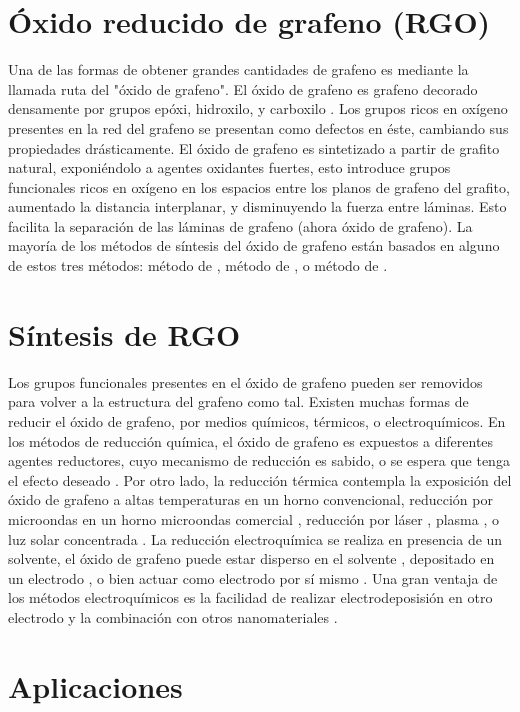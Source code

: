 \section{Óxido reducido de grafeno (RGO)}
Una de las formas de obtener grandes cantidades de grafeno es mediante la llamada ruta del "óxido de grafeno". El óxido de grafeno es grafeno decorado densamente por grupos epóxi, hidroxilo, y carboxilo \citep{Dreyer2010}. Los grupos ricos en oxígeno presentes en la red del grafeno se presentan como defectos en éste, cambiando sus propiedades drásticamente.
El óxido de grafeno es sintetizado a partir de grafito natural, exponiéndolo a agentes oxidantes fuertes, esto introduce grupos funcionales ricos en oxígeno en los espacios entre los planos de grafeno del grafito, aumentado la distancia interplanar, y disminuyendo la fuerza entre láminas. Esto facilita la separación de las láminas de grafeno (ahora óxido de grafeno). La mayoría de los métodos de síntesis del óxido de grafeno están basados en alguno de estos tres métodos: método de \citet{Brodie1859}, método de \citep{Staudenmaier1898}, o método de \citet{Hummers1958}.



\section{Síntesis de RGO}
Los grupos funcionales presentes en el óxido de grafeno pueden ser removidos para volver a la estructura del grafeno como tal. Existen muchas formas de reducir el óxido de grafeno, por medios químicos, térmicos, o electroquímicos. En los métodos de reducción química, el óxido de grafeno es expuestos a diferentes agentes reductores, cuyo mecanismo de reducción es sabido, o se espera que tenga el efecto deseado \citep{Chua2015}. Por otro lado, la reducción térmica contempla la exposición del óxido de grafeno a altas temperaturas en un horno convencional, reducción por microondas en un horno microondas comercial \citep{Zhu2010a}, reducción por láser \citep{El-Kady2013}, plasma \citep{Lee2012}, o luz solar concentrada \citep{Mohandoss2017}. La reducción electroquímica se realiza en presencia de un solvente, el óxido de grafeno puede estar disperso en el solvente \citep{Liu2011}, depositado en un electrodo \citep{Harima2011, Toh2014}, o bien actuar como electrodo por sí mismo \citep{Feng2016}. Una gran ventaja de los métodos electroquímicos es la facilidad de realizar electrodeposisión en otro electrodo y la combinación con otros nanomateriales \citep{Liu2011, Xie2014}.

\section{Aplicaciones}